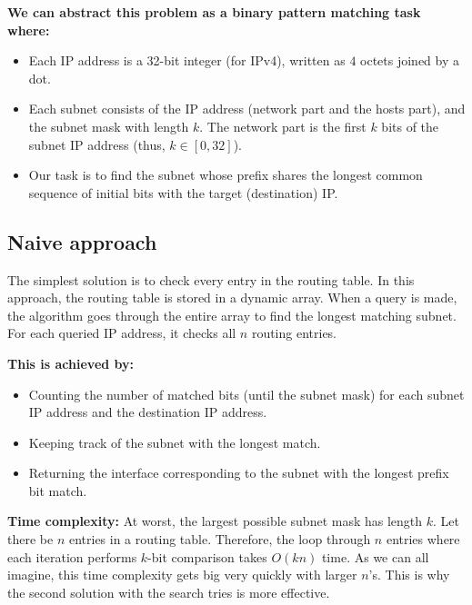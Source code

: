 \documentclass{lpm/adsrprt}
\begin{document}
\textbf{We can abstract this problem as a binary pattern matching task where:}

\begin{itemize}
    \item \> Each IP address is a 32-bit integer (for IPv4), written as $4$ octets joined by a dot.
    \item \> Each subnet consists of the IP address (network part and the hosts part), and the subnet mask with length $k$. The network part is the first $k$ bits of the subnet IP address (thus, $k \in \left[0,32 \right]$).
    \item \> Our task is to find the subnet whose prefix shares the longest common sequence of initial bits with the target (destination) IP.
\end{itemize}

\subsection{Naive approach}
The simplest solution is to check every entry in the routing table. In this approach, the routing table is stored in a dynamic array. When a query is made, the algorithm goes through the entire array to find the longest matching subnet. For each queried IP address, it checks all $n$ routing entries.

\textbf{This is achieved by:}

\begin{itemize}
    \item \> Counting the number of matched bits (until the subnet mask) for each subnet IP address and the destination IP address.
    \item \> Keeping track of the subnet with the longest match.
    \item \> Returning the interface corresponding to the subnet with the longest prefix bit match.
\end{itemize}

\textbf{Time complexity:}
At worst, the largest possible subnet mask has length $k$. Let there be $n$ entries in a routing table. Therefore, the loop through $n$ entries where each iteration performs $k$-bit comparison takes $O(kn)$ time. As we can all imagine, this time complexity gets big very quickly with larger $n$'s. This is why the second solution with the search tries is more effective.

\end{document}
